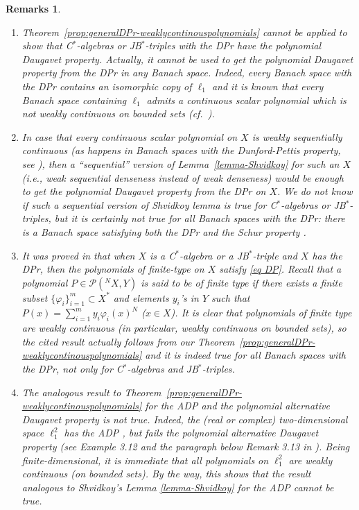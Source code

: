 \documentclass[10pt]{amsart}
\newtheorem{remarks}[theorem]{Remarks}
\begin{document}
	\begin{remarks}$ $
		\begin{enumerate}[$\bullet$]
			\item Theorem~\ref{prop:generalDPr-weaklycontinouspolynomials} cannot be applied to show that C$^*$-algebras or JB$^*$-triples with the DPr have the polynomial Daugavet property. Actually, it cannot be used to get the polynomial Daugavet property from the DPr in any Banach space. Indeed, every Banach space with the DPr contains an isomorphic copy of $\ell_1$ \cite[Theorem~2.9]{kssw} and it is known that every Banach space containing $\ell_1$ admits a continuous scalar polynomial which is not weakly continuous on bounded sets {\rm (}cf.\ \cite[Proposition~2.36 and its proof]{Di99}{\rm )}.
			\item In case that every continuous scalar polynomial on $X$ is weakly sequentially continuous  {\rm (}as happens in Banach spaces with the Dunford-Pettis property, see \cite[Proposition~2.34]{Di99}{\rm )}, then a ``sequential'' version of Lemma~\ref{lemma-Shvidkoy} for such an $X$ {\rm (}i.e., weak sequential denseness instead of weak denseness{\rm )} would be enough to get the polynomial Daugavet property from the DPr on $X$. We do not know if such a sequential version of Shvidkoy lemma is true for C$^*$-algebras or JB$^*$-triples, but it is certainly not true for all Banach spaces with the DPr: there is a Banach space satisfying both the DPr and the Schur property \cite{KW-shurDPr}.
			\item It was proved in \cite[Theorem~3.5]{Santos2014} that when $X$ is a C$^*$-algebra or a JB$^*$-triple and $X$ has the DPr, then the polynomials of finite-type on $X$ satisfy \eqref{eq DP}. Recall that a polynomial $P\in \mathcal{P}(^N X,Y)$ is said to be of \emph{finite type} if there exists a finite subset $\{\varphi_i\}_{i=1}^{m}\subset X^*$ and elements $y_i$'s in $Y$ such that $\displaystyle P(x) = \sum_{i=1}^m y_i \varphi_i (x)^N$ {\rm (}$x\in X${\rm )}. It is clear that polynomials of finite type are weakly continuous {\rm(}in particular, weakly continuous on bounded sets{\rm)}, so the cited result \cite[Theorem~3.5]{Santos2014} actually follows from our Theorem~\ref{prop:generalDPr-weaklycontinouspolynomials} and it is indeed true for all Banach spaces with the DPr, not only for C$^*$-algebras and JB$^*$-triples.
			\item The analogous result to Theorem~\ref{prop:generalDPr-weaklycontinouspolynomials} for the ADP and the polynomial alternative Daugavet property is not true. Indeed, the {\rm (}real or complex{\rm )} two-dimensional space $\ell_1^2$ has the ADP \cite{MarOikh2004}, but fails the polynomial alternative Daugavet property {\rm (}see Example 3.12 and the paragraph below Remark 3.13 in \cite{ChoGarMaestreMartin2007}{\rm )}. Being finite-dimensional, it is immediate that all polynomials on $\ell_1^2$ are weakly continuous {\rm(}on bounded sets{\rm)}. By the way, this shows that the result analogous to Shvidkoy's Lemma \ref{lemma-Shvidkoy} for the ADP cannot be true.
		\end{enumerate}
	\end{remarks}
	
\end{document}
